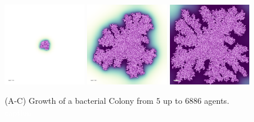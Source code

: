 \documentclass{article}
\newcommand{\todo}[1]{\colorbox{WildStrawberry}{\textcolor{white}{#1}}}
\begin{document}
\begin{figure}[H]
    \centering
    \includegraphics[width=0.32\textwidth]{figures/crb_sim_branching/cells_at_iter_0000000200.png}%
    \hspace{0.01\textwidth}%
    \includegraphics[width=0.32\textwidth]{figures/crb_sim_branching/cells_at_iter_0000003400.png}%
    \hspace{0.01\textwidth}%
    \includegraphics[width=0.32\textwidth]{figures/crb_sim_branching/cells_at_iter_0000006600.png}%
    \caption{
        (A-C) Growth of a bacterial Colony from $5$ up to $6886$ agents.
        \todo{caption}
    }
    \label{fig:bacterial-branching-sim}
\end{figure}
\end{document}
